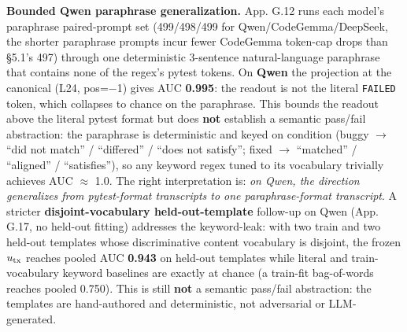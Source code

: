 \documentclass[
  11pt,
  a4paper]{article}
\newcounter{none} %
\begin{document}
\textbf{Bounded Qwen paraphrase generalization.} App. G.12 runs each
model's paraphrase paired-prompt set (499/498/499 for
Qwen/CodeGemma/DeepSeek, the shorter paraphrase prompts incur fewer
CodeGemma token-cap drops than \S{}5.1's 497) through one deterministic
3-sentence natural-language paraphrase that contains none of the regex's
pytest tokens. On \textbf{Qwen} the projection at the canonical (L24,
pos=\ensuremath{-}1) gives AUC \textbf{0.995}: the readout is not the literal
\texttt{FAILED} token, which collapses to chance on the paraphrase. This
bounds the readout above the literal pytest format but does \textbf{not}
establish a semantic pass/fail abstraction: the paraphrase is
deterministic and keyed on condition (buggy \ensuremath{\rightarrow} ``did not match'' /
``differed'' / ``does not satisfy''; fixed \ensuremath{\rightarrow} ``matched'' / ``aligned'' /
``satisfies''), so any keyword regex tuned to its vocabulary trivially
achieves AUC \ensuremath{\approx} 1.0. The right interpretation is: \emph{on Qwen, the
direction generalizes from pytest-format transcripts to one
paraphrase-format transcript}. A stricter \textbf{disjoint-vocabulary
held-out-template} follow-up on Qwen (App. G.17, no held-out fitting)
addresses the keyword-leak: with two train and two held-out templates
whose discriminative content vocabulary is disjoint, the frozen
\(u_{\rm tx}\) reaches pooled AUC \textbf{0.943} on held-out templates
while literal and train-vocabulary keyword baselines are exactly at
chance (a train-fit bag-of-words reaches pooled 0.750). This is still
\textbf{not} a semantic pass/fail abstraction: the templates are
hand-authored and deterministic, not adversarial or LLM-generated.
\end{document}
